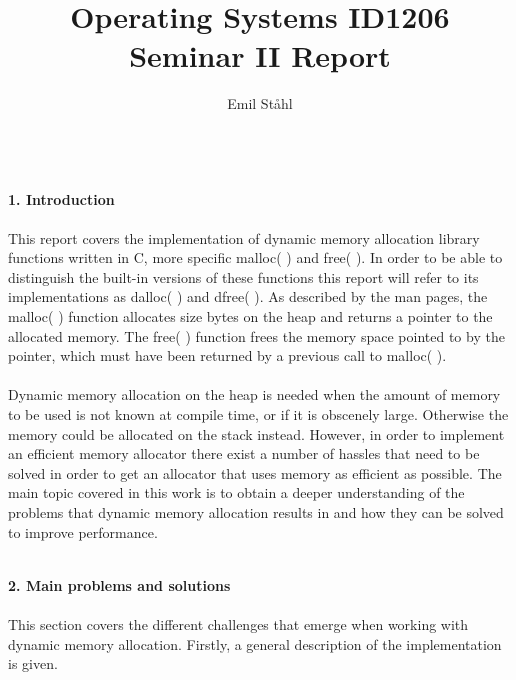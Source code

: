 \documentclass[a4paper,10pt]{article}
\title{\textbf{Operating Systems ID1206} \\ 
\textbf{Seminar II Report}}
\author{Emil Ståhl}
\begin{document}
\maketitle
\textbf
{\\1. Introduction\\\\}
This report covers the implementation of dynamic memory allocation library functions written in C, more specific malloc( ) and free( ). In order to be able to distinguish the built-in versions of these functions this report will refer to its implementations as dalloc( ) and dfree( ). As described by the man pages, the malloc( ) function allocates size bytes on the heap and returns a pointer to the allocated memory. The free( ) function frees the memory space pointed to by the pointer, which must have been returned by a previous call to malloc( ). \\\\Dynamic memory allocation on the heap is needed when the amount of memory to be used is not known at compile time, or if it is obscenely large. Otherwise the memory could be allocated on the stack instead.  However,  in order to implement an efficient memory allocator there exist a number of hassles that need to be solved in order to get an allocator that uses memory as efficient as possible. The main topic covered in this work is to obtain a deeper understanding of the problems that dynamic memory allocation results in and how they can be solved to improve performance.

\maketitle
\textbf
{\\2. Main problems and solutions\\\\}
This section covers the different challenges that emerge when working with dynamic memory allocation. Firstly, a general description of the implementation is given.
\end{document}
